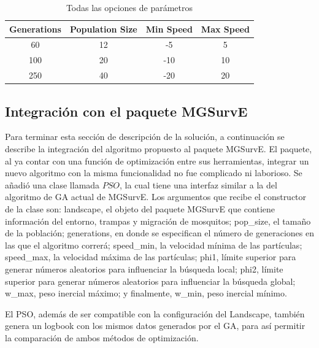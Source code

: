 \documentclass[letterpaper]{report}
\begin{document}
    \begin{table}[ht!]
      \caption{Todas las opciones de parámetros}
      \begin{center}
        \begin{tabular}{|c|c|c|c|}
          \hline
          Generations & Population Size & Min Speed & Max Speed \\
          \hline
          60 & 12 & -5 & 5 \\
          \hline
          100 & 20 & -10 & 10 \\
          \hline
          250 & 40 & -20 & 20 \\
          \hline
        \end{tabular}
        \label{table:params-options}
      \end{center}
    \end{table}

    \subsection{Integración con el paquete MGSurvE}

    Para terminar esta sección de descripción de la solución, a continuación se
    describe la integración del algoritmo propuesto al paquete MGSurvE. El
    paquete, al ya contar con una función de optimización entre sus
    herramientas, integrar un nuevo algoritmo con la misma funcionalidad no fue
    complicado ni laborioso. Se añadió una clase llamada $PSO$, la cual tiene
    una interfaz similar a la del algoritmo de GA actual de MGSurvE. Los
    argumentos que recibe el constructor de la clase son: landscape, el objeto
    del paquete MGSurvE que contiene información del entorno, trampas y
    migración de mosquitos; pop\_size, el tamaño de la población; generations,
    en donde se especifican el número de generaciones en las que el algoritmo
    correrá; speed\_min, la velocidad mínima de las partículas; speed\_max, la
    velocidad máxima de las partículas; phi1, límite superior para generar
    números aleatorios para influenciar la búsqueda local; phi2, límite superior
    para generar números aleatorios para influenciar la búsqueda global; w\_max,
    peso inercial máximo; y finalmente, w\_min, peso inercial mínimo.
    
    El PSO, además de ser compatible con la configuración del Landscape, también
    genera un logbook con los mismos datos generados por el GA, para así
    permitir la comparación de ambos métodos de optimización. 
\end{document}
